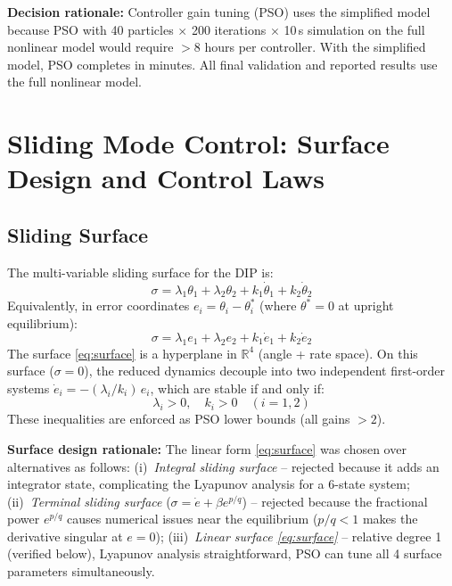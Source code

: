 \documentclass[11pt, a4paper]{article}
\newcommand{\R}{\mathbb{R}}
\begin{document}
\textbf{Decision rationale:} Controller gain tuning (PSO) uses the simplified
model because PSO with 40 particles $\times$ 200 iterations $\times$ 10\,s
simulation on the full nonlinear model would require $>$8 hours per controller.
With the simplified model, PSO completes in minutes.
All final validation and reported results use the full nonlinear model.

\section{Sliding Mode Control: Surface Design and Control Laws}

\subsection{Sliding Surface}

The multi-variable sliding surface for the DIP is:
\begin{equation}
  \sigma = \lambda_1\theta_1 + \lambda_2\theta_2
           + k_1\dot{\theta}_1 + k_2\dot{\theta}_2
  \label{eq:surface}
\end{equation}
Equivalently, in error coordinates $e_i = \theta_i - \theta_i^*$ (where
$\theta^* = 0$ at upright equilibrium):
\begin{equation}
  \sigma = \lambda_1 e_1 + \lambda_2 e_2
           + k_1\dot{e}_1 + k_2\dot{e}_2
\end{equation}
The surface \eqref{eq:surface} is a hyperplane in $\R^4$ (angle + rate space).
On this surface ($\sigma=0$), the reduced dynamics decouple into two independent
first-order systems $\dot{e}_i = -(\lambda_i/k_i)\,e_i$, which are stable if
and only if:
\begin{equation}
  \lambda_i > 0, \quad k_i > 0 \quad (i = 1, 2)
  \label{eq:stability_cond}
\end{equation}
These inequalities are enforced as PSO lower bounds (all gains $> 2$).

\textbf{Surface design rationale:} The linear form \eqref{eq:surface} was chosen
over alternatives as follows:
(i)~\textit{Integral sliding surface} -- rejected because it adds an integrator
state, complicating the Lyapunov analysis for a 6-state system;
(ii)~\textit{Terminal sliding surface} ($\sigma = \dot{e} + \beta e^{p/q}$) --
rejected because the fractional power $e^{p/q}$ causes numerical issues
near the equilibrium ($p/q < 1$ makes the derivative singular at $e=0$);
(iii)~\textit{Linear surface \eqref{eq:surface}} -- relative degree 1
(verified below), Lyapunov analysis straightforward, PSO can tune all 4
surface parameters simultaneously.
\end{document}
